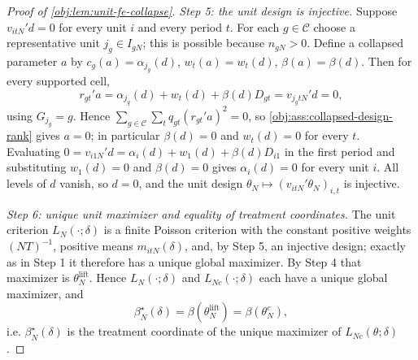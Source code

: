 \documentclass[11pt]{article}
\begin{document}
\begin{proof}[Proof of \cref{obj:lem:unit-fe-collapse}]
\textit{Step 5: the unit design is injective.} Suppose \(v_{itN}'d=0\) for every unit \(i\) and every period \(t\). For each \(g\in\mathcal C\) choose a representative unit \(j_g\in I_{gN}\); this is possible because \(n_{gN}>0\). Define a collapsed parameter \(a\) by \(c_g(a)=\alpha_{j_g}(d)\), \(w_t(a)=w_t(d)\), \(\beta(a)=\beta(d)\). Then for every supported cell,
\[
r_{gt}'a
=
\alpha_{j_g}(d)+w_t(d)+\beta(d)D_{gt}
=
v_{j_gtN}'d
=
0,
\]
using \(G_{j_g}=g\). Hence \(\sum_{g\in\mathcal C}\sum_t q_{gt}(r_{gt}'a)^2=0\), so \cref{obj:ass:collapsed-design-rank} gives \(a=0\); in particular \(\beta(d)=0\) and \(w_t(d)=0\) for every \(t\). Evaluating \(0=v_{i1N}'d=\alpha_i(d)+w_1(d)+\beta(d)D_{i1}\) in the first period and substituting \(w_1(d)=0\) and \(\beta(d)=0\) gives \(\alpha_i(d)=0\) for every unit \(i\). All levels of \(d\) vanish, so \(d=0\), and the unit design \(\theta_N\mapsto(v_{itN}'\theta_N)_{i,t}\) is injective.

\textit{Step 6: unique unit maximizer and equality of treatment coordinates.} The unit criterion \(L_N(\cdot;\delta)\) is a finite Poisson criterion with the constant positive weights \((NT)^{-1}\), positive means \(m_{itN}(\delta)\), and, by Step 5, an injective design; exactly as in Step 1 it therefore has a unique global maximizer. By Step 4 that maximizer is \(\theta_N^{\text{lift}}\). Hence \(L_N(\cdot;\delta)\) and \(L_{Nc}(\cdot;\delta)\) each have a unique global maximizer, and
\[
\beta_N^\star(\delta)=\beta(\theta_N^{\text{lift}})=\beta(\theta_N^c),
\]
i.e. \(\beta_N^\star(\delta)\) is the treatment coordinate of the unique maximizer of \(L_{Nc}(\theta;\delta)\).


\end{proof}
\end{document}
